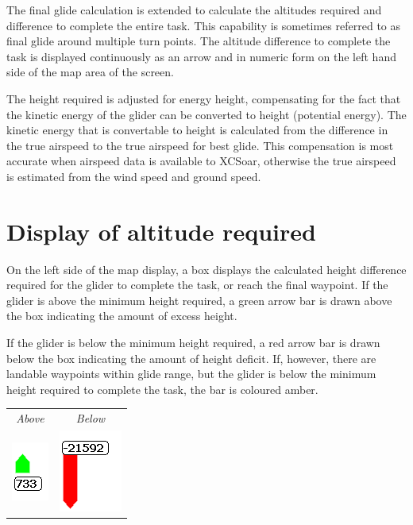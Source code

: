 The final glide calculation is extended to calculate the altitudes
required and difference to complete the entire task.  This capability
is sometimes referred to as final glide around multiple turn points.
The altitude difference to complete the task is displayed continuously
as an arrow and in numeric form on the left hand side of the map area
of the screen.

The height required is adjusted for energy height, compensating for
the fact that the kinetic energy of the glider can be converted to
height (potential energy).  The kinetic energy that is convertable to
height is calculated from the difference in the true airspeed to the
true airspeed for best glide.  This compensation is most accurate when
airspeed data is available to XCSoar, otherwise the true airspeed is
estimated from the wind speed and ground speed.

\section{Display of altitude required}

On the left side of the map display, a box displays the calculated
height difference required for the glider to complete the task, or
reach the final waypoint.  If the glider is above the minimum height
required, a green arrow bar is drawn above the box indicating the
amount of excess height.

If the glider is below the minimum height required, a red arrow bar is
drawn below the box indicating the amount of height deficit.  If,
however, there are landable waypoints within glide range, but the
glider is below the minimum height required to complete the task, the
bar is coloured amber.

\begin{center}
\begin{tabular}{c c}
{\it Above} & {\it Below} \\
\includegraphics[angle=0,width=0.15\linewidth,keepaspectratio='true']{figures/cut-fg-above.png} &
\includegraphics[angle=0,width=0.2\linewidth,keepaspectratio='true']{figures/cut-fg-below.png} \\
\end{tabular}
\end{center}

